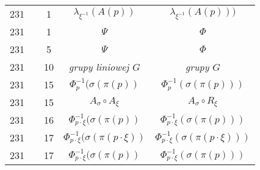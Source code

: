 \documentclass[a4paper,11pt]{article}
\begin{document}
\begin{center}
\begin{tabular}{|c|c|c|c|c|}
    231 & & \hphantom{0}1 & $\lambda_{ \xi^{ -1 } }( A( p ) )$
    & $\lambda_{ \xi^{ -1 } }( A( p ) ) )$ \\
    231 & & \hphantom{0}1 & $\Psi$ & $\Phi$ \\
    231 & & \hphantom{0}5 & $\Psi$ & $\Phi$ \\
    231 & & 10 & \textit{grupy liniowej $G$} & \textit{grupy $G$} \\
    231 & & 15 & $\Phi^{ -1 }_{ p }( \sigma( \pi( p ) )$
           & $\Phi^{ -1 }_{ p }( \sigma( \pi( p ) ) )$ \\
    231 & & 15 & $A_{ \sigma } \circ A_{ \xi }$ & $A_{ \sigma } \circ R_{ \xi }$ \\
    231 & & 16 & $\Phi^{ -1 }_{ p \cdot \xi }( \sigma( \pi( p ) )$
           & $\Phi^{ -1 }_{ p \cdot \xi }( \sigma( \pi( p ) ) )$ \\
    231 & & 17 & $\Phi^{ -1 }_{ p \cdot \xi }( \sigma( \pi( p \cdot \xi ) )$
           & $\Phi^{ -1 }_{ p \cdot \xi }( \sigma( \pi( p \cdot \xi ) ) )$ \\
    231 & & 17 & $\Phi^{ -1 }_{ p \cdot \xi }( \sigma( \pi( p ) )$
           & $\Phi^{ -1 }_{ p \cdot \xi }( \sigma( \pi( p ) ) )$ \\
    \hline
  \end{tabular}





  \newpage


\end{center}
\end{document}
